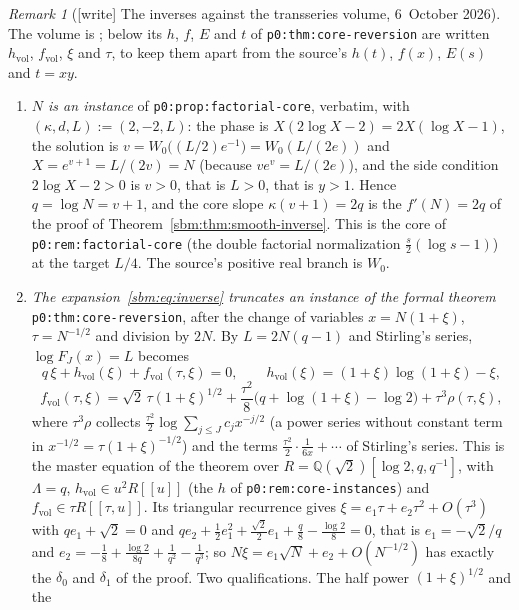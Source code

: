 \documentclass[11pt,letterpaper]{article}
\numberwithin{equation}{section}
\theoremstyle{remark}\newtheorem{remark}[theorem]{Remark}
\newcommand{\QQ}{\mathbb Q}
\newcommand{\file}[1]{\nolinkurl{#1}}
\begin{document}
\begin{remark}[{[write]} The inverses against the transseries volume, 6~October 2026]\label{sbm:rem:transseries}
The volume is
;
below its $h$, $f$, $E$ and $t$ of \file{p0:thm:core-reversion} are written
$h_{\mathrm{vol}}$, $f_{\mathrm{vol}}$, $\xi$ and $\tau$, to keep them apart
from the source's $h(t)$, $f(x)$, $E(s)$ and $t=xy$.
\begin{enumerate}
\item[(a)] \emph{$N$ is an instance} of \file{p0:prop:factorial-core},
 verbatim, with $(\kappa,d,L):=(2,-2,L)$: the phase is
 $X(2\log X-2)=2X(\log X-1)$, the solution is
 $v=W_0\bigl((L/2)e^{-1}\bigr)=W_0(L/(2e))$ and $X=e^{v+1}=L/(2v)=N$
 (because $ve^v=L/(2e)$), and the side condition $2\log X-2>0$ is $v>0$,
 that is $L>0$, that is $y>1$. Hence $q=\log N=v+1$, and the core slope
 $\kappa(v+1)=2q$ is the $f'(N)=2q$ of the proof of
 Theorem~\ref{sbm:thm:smooth-inverse}. This is the core of
 \file{p0:rem:factorial-core} (the double factorial normalization
 $\tfrac s2(\log s-1)$) at the target $L/4$. The source's positive real
 branch is $W_0$.
\item[(b)] \emph{The expansion~\eqref{sbm:eq:inverse} truncates an instance
 of the formal theorem} \file{p0:thm:core-reversion}, after the change of
 variables $x=N(1+\xi)$, $\tau=N^{-1/2}$ and division by $2N$. By
 $L=2N(q-1)$ and Stirling's series, $\log F_J(x)=L$ becomes
 \[
  q\,\xi+h_{\mathrm{vol}}(\xi)+f_{\mathrm{vol}}(\tau,\xi)=0,\qquad
  h_{\mathrm{vol}}(\xi)=(1+\xi)\log(1+\xi)-\xi,
 \]
 \[
  f_{\mathrm{vol}}(\tau,\xi)=\sqrt2\,\tau(1+\xi)^{1/2}
   +\frac{\tau^2}8\bigl(q+\log(1+\xi)-\log2\bigr)+\tau^3\rho(\tau,\xi),
 \]
 where $\tau^3\rho$ collects $\frac{\tau^2}2\log\sum_{j\le J}c_jx^{-j/2}$
 (a power series without constant term in $x^{-1/2}=\tau(1+\xi)^{-1/2}$)
 and the terms
 $\frac{\tau^2}2\cdot\frac1{6x}+\cdots$ of Stirling's series. This is the master
 equation of the theorem over $R=\QQ(\sqrt2)[\log2,q,q^{-1}]$, with
 $\Lambda=q$, $h_{\mathrm{vol}}\in u^2R[[u]]$ (the $h$ of
 \file{p0:rem:core-instances}) and $f_{\mathrm{vol}}\in\tau R[[\tau,u]]$.
 Its triangular recurrence gives $\xi=e_1\tau+e_2\tau^2+O(\tau^3)$ with
 $qe_1+\sqrt2=0$ and
 $qe_2+\tfrac12e_1^2+\tfrac{\sqrt2}2e_1+\tfrac q8-\tfrac{\log2}8=0$, that is
 $e_1=-\sqrt2/q$ and
 $e_2=-\frac18+\frac{\log2}{8q}+\frac1{q^2}-\frac1{q^3}$; so
 $N\xi=e_1\sqrt N+e_2+O(N^{-1/2})$ has exactly the $\delta_0$ and $\delta_1$
 of the proof. Two qualifications. The half power $(1+\xi)^{1/2}$ and the

\end{enumerate}
\end{remark}
\end{document}
